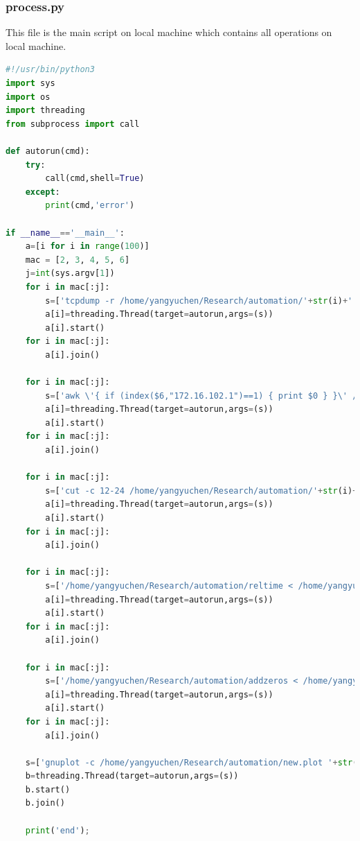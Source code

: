 \documentclass[12pt,a4paper]{article}
\begin{document}
\subsubsection*{process.py}
This file is the main script on local machine which contains all operations on local machine.
\begin{lstlisting}[language=Python]
#!/usr/bin/python3
import sys
import os
import threading
from subprocess import call

def autorun(cmd):
    try:
        call(cmd,shell=True)
    except:
        print(cmd,'error')

if __name__=='__main__':
    a=[i for i in range(100)]
    mac = [2, 3, 4, 5, 6]
    j=int(sys.argv[1])
    for i in mac[:j]:
        s=['tcpdump -r /home/yangyuchen/Research/automation/'+str(i)+'.pcap -s 60 -i p4p1 -tttt -nnq > /home/yangyuchen/Research/automation/'+str(i)+'.txt']
        a[i]=threading.Thread(target=autorun,args=(s))
        a[i].start()
    for i in mac[:j]:
        a[i].join()

    for i in mac[:j]:
        s=['awk \'{ if (index($6,"172.16.102.1")==1) { print $0 } }\' /home/yangyuchen/Research/automation/'+str(i)+'.txt > /home/yangyuchen/Research/automation/'+str(i)+'_data.txt']
        a[i]=threading.Thread(target=autorun,args=(s))
        a[i].start()
    for i in mac[:j]:
        a[i].join()

    for i in mac[:j]:
        s=['cut -c 12-24 /home/yangyuchen/Research/automation/'+str(i)+'_data.txt | awk \'{print $1}\' | sort | uniq -c  | awk \'{print $2 " " $1}\' > /home/yangyuchen/Research/automation/'+str(i)+'_packets_count.txt']
        a[i]=threading.Thread(target=autorun,args=(s))
        a[i].start()
    for i in mac[:j]:
        a[i].join()

    for i in mac[:j]:
        s=['/home/yangyuchen/Research/automation/reltime < /home/yangyuchen/Research/automation/'+str(i)+'_packets_count.txt > /home/yangyuchen/Research/automation/'+str(i)+'_reltime_count.txt']
        a[i]=threading.Thread(target=autorun,args=(s))
        a[i].start()
    for i in mac[:j]:
        a[i].join()

    for i in mac[:j]:
        s=['/home/yangyuchen/Research/automation/addzeros < /home/yangyuchen/Research/automation/'+str(i)+'_reltime_count.txt > /home/yangyuchen/Research/automation/'+str(i)+'_final_count.txt']
        a[i]=threading.Thread(target=autorun,args=(s))
        a[i].start()
    for i in mac[:j]:
        a[i].join()

    s=['gnuplot -c /home/yangyuchen/Research/automation/new.plot '+str(j)]
    b=threading.Thread(target=autorun,args=(s))
    b.start()
    b.join()

    print('end');
\end{lstlisting}
\end{document}
